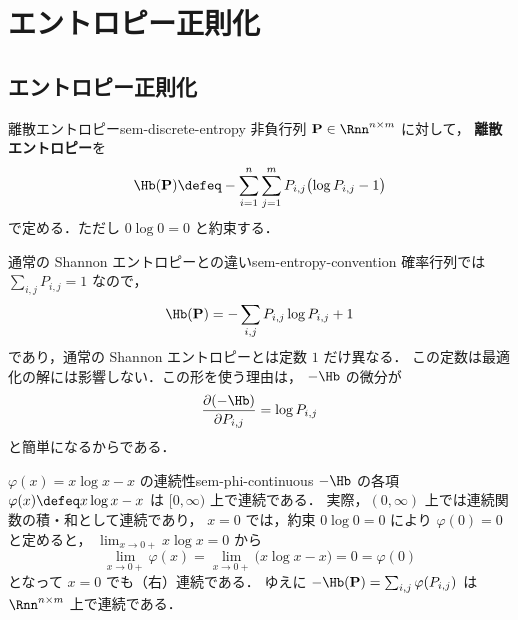 \chapter{エントロピー正則化}
\label{ch:seminar-03-entropic}

\section{エントロピー正則化}
\label{sec:sem-entropic-regularization}

\begin{definition}{離散エントロピー}{sem-discrete-entropy}
  非負行列 $\mathbf{P} \in \Rnn^{n \times m}$ に対して，
  \textbf{離散エントロピー}を
  \[
    \Hb(\mathbf{P})
    \defeq
    - \sum_{i=1}^{n} \sum_{j=1}^{m}
      P_{i,j}\bigl(\log P_{i,j} - 1\bigr)
  \]
  で定める．ただし $0\log 0 = 0$ と約束する．
\end{definition}

\begin{remark}{通常の Shannon エントロピーとの違い}{sem-entropy-convention}
  確率行列では $\sum_{i,j}P_{i,j}=1$ なので，
  \[
    \Hb(\mathbf{P})
    =
    -\sum_{i,j} P_{i,j}\log P_{i,j} + 1
  \]
  であり，通常の Shannon エントロピーとは定数 $1$ だけ異なる．
  この定数は最適化の解には影響しない．この形を使う理由は，
  $-\Hb$ の微分が
  \[
    \frac{\partial(-\Hb)}{\partial P_{i,j}} = \log P_{i,j}
  \]
  と簡単になるからである．
\end{remark}

\begin{remark}{$\varphi(x)=x\log x-x$ の連続性}{sem-phi-continuous}
  $-\Hb$ の各項 $\varphi(x) \defeq x\log x - x$ は $[0,\infty)$ 上で連続である．
  実際，$(0,\infty)$ 上では連続関数の積・和として連続であり，
  $x = 0$ では，約束 $0\log 0 = 0$ により $\varphi(0) = 0$ と定めると，
  $\lim_{x\to0+} x\log x = 0$ から
  \[
    \lim_{x \to 0+} \varphi(x)
    = \lim_{x \to 0+}\bigl(x\log x - x\bigr) = 0 = \varphi(0)
  \]
  となって $x = 0$ でも（右）連続である．
  ゆえに $-\Hb(\mathbf{P}) = \sum_{i,j}\varphi(P_{i,j})$ は
  $\Rnn^{n\times m}$ 上で連続である．
\end{remark}

